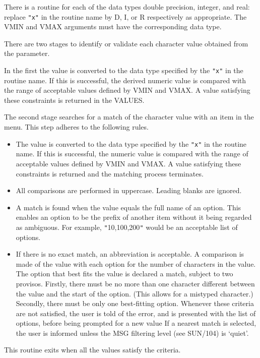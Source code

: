 \documentclass[twoside,11pt]{article}
\newcommand{\xref}[3]{#1}
\newcommand{\latex}[1]{#1}
\newcommand{\sstitem}{\item}
\newcommand{\sstitem}{\item}
\begin{document}
{{{         \sstitem
         There is a routine for each of the data types double precision,
         integer, and real: replace {\tt "x"} in the routine name by D, I, or R
         respectively as appropriate.  The VMIN and VMAX arguments must
         have the corresponding data type.

         \sstitem
         There are two stages to identify or validate each character
         value obtained from the parameter.

      In the first the value is converted to the data type specified by
      the {\tt "x"} in the routine name.  If this is successful, the derived
      numeric value is compared with the range of acceptable values
      defined by VMIN and VMAX.  A value satisfying these constraints
      is returned in the VALUES.

      The second stage searches for a match of the character value with
      an item in the menu.  This step adheres to the following rules.
         \begin{itemize}
         \item  The value is converted to the data type specified by the
         {\tt "x"} in the routine name.  If this is successful, the numeric
         value is compared with the range of acceptable values defined
         by VMIN and VMAX.  A value satisfying these constraints is
         returned and the matching process terminates.
         \item  All comparisons are performed in uppercase.  Leading blanks
         are ignored.
         \item  A match is found when the value equals the full name of an
         option.  This enables an option to be the prefix of another
         item without it being regarded as ambiguous.  For example,
         {\tt "}10,100,200{\tt "} would be an acceptable list of options.
         \item If there is no exact match, an abbreviation is acceptable.
         A comparison is made of the value with each option for the
         number of characters in the value.  The option that best fits
         the value is declared a match, subject to two provisos.
         Firstly, there must be no more than one character different
         between the value and the start of the option.  (This allows
         for a mistyped character.)  Secondly, there must be only one
         best-fitting option.  Whenever these criteria are not
         satisfied, the user is told of the error, and is presented
         with the list of options, before being prompted for a new value
         If a nearest match is selected, the user is informed unless the
\xref{MSG filtering level}{sun104}{conditional_message_reporting}
\latex{ (see SUN/104)} is `quiet'.
         \end{itemize}

      This routine exits when all the values satisfy the criteria.
      }
   }
}
\end{document}
